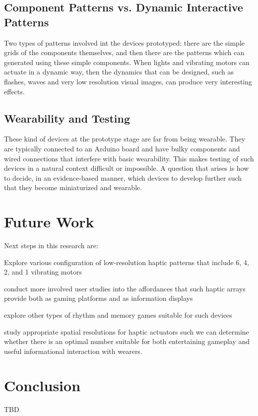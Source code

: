 \documentclass{chi-ext}
\begin{document}
\subsection{Component Patterns vs. Dynamic Interactive Patterns}
Two types of patterns involved int the devices prototyped: there are the simple grids of the components themselves, and then there are the patterns which can generated using these simple components. When lights and vibrating motors can actuate in a dynamic way, then the dynamics that can be designed, such as flashes, waves and very low resolution visual images, can produce very interesting effects. 

\subsection{Wearability and Testing}
These kind of devices at the prototype stage are far from being wearable. They are typically connected to an Arduino board and have bulky components and wired connections that interfere with basic wearability. This makes testing of such devices in a natural context difficult or impossible. A question that arises is how to decide, in an evidence-based manner, which devices to develop further such that they become miniaturized and wearable. 

\section{Future Work}
Next steps in this research are:
\begin{inparaenum}
\item Explore various configuration of low-resolution haptic patterns that include 6, 4, 2, and 1 vibrating motors
\item conduct more involved user studies into the affordances that such haptic arrays provide both as gaming platforms and as information displays 
\item explore other types of rhythm and memory games suitable for such devices
\item study appropriate spatial resolutions for haptic actuators such we can determine whether there is an optimal number suitable for both entertaining gameplay and useful informational interaction with wearers.
\end{inparaenum}

\section{Conclusion}
TBD
\end{document}
